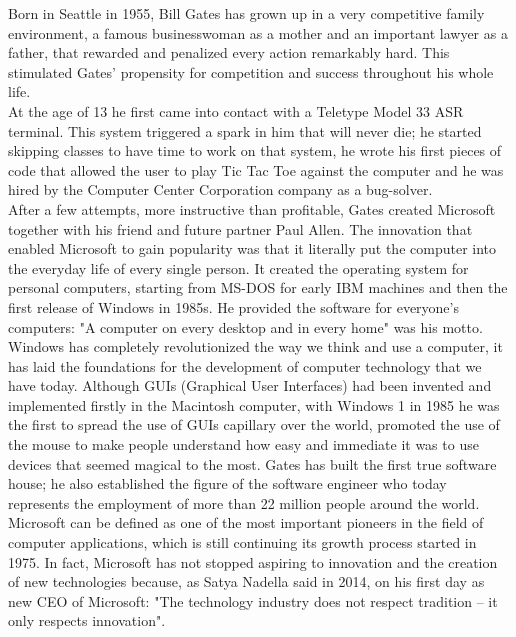 Born in Seattle in 1955, Bill Gates has grown up in a very competitive family environment, a famous businesswoman as a mother and an important lawyer as a father, that rewarded and penalized every action remarkably hard. This stimulated Gates' propensity for competition and success throughout his whole life. \\
At the age of 13 he first came into contact with a Teletype Model 33 ASR terminal. This system triggered a spark in him that will never die; he started skipping classes to have time to work on that system, he wrote his first pieces of code that allowed the user to play Tic Tac Toe against the computer and he was hired by the Computer Center Corporation company as a bug-solver. \\
After a few attempts, more instructive than profitable, Gates created Microsoft together with his friend and future partner Paul Allen. The innovation that enabled Microsoft to gain popularity was that it literally put the computer into the everyday life of every single person.  It created the operating system for personal computers, starting from MS-DOS for early IBM machines and then the first release of Windows in 1985s. He provided the software for everyone’s computers: "A computer on every desktop and in every home" was his motto. Windows has completely revolutionized the way we think and use a computer, it has laid the foundations for the development of computer technology that we have today. Although GUIs (Graphical User Interfaces) had been invented and implemented firstly in the Macintosh computer, with Windows 1 in 1985 he was the first to spread the use of GUIs capillary over the world, promoted the use of the mouse to make people understand how easy and immediate it was to use devices that seemed magical to the most. Gates has built the first true software house; he also established the figure of the software engineer who today represents the employment of more than 22 million people around the world\textsuperscript{\cite{22MilSoft}}. \\
Microsoft can be defined as one of the most important pioneers in the field of computer applications, which is still continuing its growth process started in 1975. In fact, Microsoft has not stopped aspiring to innovation and the creation of new technologies because, as Satya Nadella said in 2014, on his first day as new CEO of Microsoft: "The technology industry does not respect tradition – it only respects innovation"\textsuperscript{\cite{NadellaCitation}}. \\
